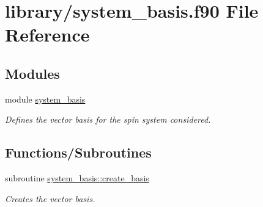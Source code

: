 \hypertarget{system__basis_8f90}{
\section{library/system\_\-basis.f90 File Reference}
\label{system__basis_8f90}
}
\subsection*{Modules}
\begin{DoxyCompactItemize}
\item 
module \hyperlink{namespacesystem__basis}{system\_\-basis}


\begin{DoxyCompactList}\small\item\em Defines the vector basis for the spin system considered. \item\end{DoxyCompactList}\end{DoxyCompactItemize}
\subsection*{Functions/Subroutines}
\begin{DoxyCompactItemize}
\item 
subroutine \hyperlink{namespacesystem__basis_a12b502e29bd15e35c91dd08f836f4e20}{system\_\-basis::create\_\-basis}
\begin{DoxyCompactList}\small\item\em Creates the vector basis. \item\end{DoxyCompactList}\end{DoxyCompactItemize}
